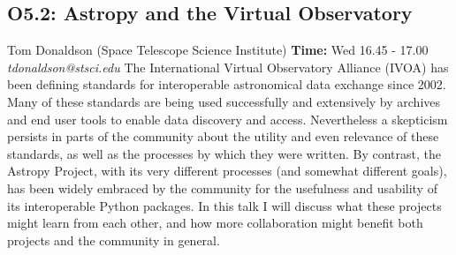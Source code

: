 \documentclass{report}
\begin{document}
\subsection*{O5.2: Astropy and the Virtual Observatory}
\bigskip
Tom Donaldson (Space Telescope Science Institute) \newline   \newline   \newline   \newline  \newline  \newline\newline
{\bf Time:} Wed 16.45 - 17.00\newline
\newline
{\it tdonaldson@stsci.edu}\newline
\newline\newline
The International Virtual Observatory Alliance (IVOA) has been defining standards for interoperable astronomical data exchange since 2002.  Many of these standards are being used successfully and extensively by archives and end user tools to enable data discovery and access.  Nevertheless a skepticism persists in parts of the community about the utility and even relevance of these standards, as well as the processes by which they were written.  By contrast, the Astropy Project, with its very different processes (and somewhat different goals), has been widely embraced by the community for the usefulness and usability of its interoperable Python packages.  In this talk I will discuss what these projects might learn from each other, and how more collaboration might benefit both projects and the community in general.\newline
\newpage
\end{document}
